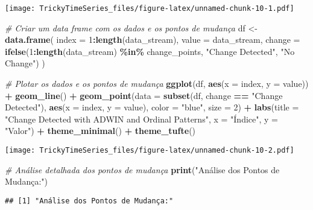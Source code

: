 \documentclass[
]{article}
\newenvironment{Shaded}{\begin{snugshade}}{\end{snugshade}}
\newcommand{\AttributeTok}[1]{\textcolor[rgb]{0.13,0.29,0.53}{#1}}
\newcommand{\CommentTok}[1]{\textcolor[rgb]{0.56,0.35,0.01}{\textit{#1}}}
\newcommand{\DecValTok}[1]{\textcolor[rgb]{0.00,0.00,0.81}{#1}}
\newcommand{\FunctionTok}[1]{\textcolor[rgb]{0.13,0.29,0.53}{\textbf{#1}}}
\newcommand{\NormalTok}[1]{#1}
\newcommand{\OtherTok}[1]{\textcolor[rgb]{0.56,0.35,0.01}{#1}}
\newcommand{\SpecialCharTok}[1]{\textcolor[rgb]{0.81,0.36,0.00}{\textbf{#1}}}
\newcommand{\StringTok}[1]{\textcolor[rgb]{0.31,0.60,0.02}{#1}}
\begin{document}
\texttt{[image: TrickyTimeSeries\_files/figure-latex/unnamed-chunk-10-1.pdf]}

\begin{Shaded}
\begin{Highlighting}[]
\CommentTok{\# Criar um data frame com os dados e os pontos de mudança}
\NormalTok{df }\OtherTok{\textless{}{-}} \FunctionTok{data.frame}\NormalTok{(}
  \AttributeTok{index =} \DecValTok{1}\SpecialCharTok{:}\FunctionTok{length}\NormalTok{(data\_stream),}
  \AttributeTok{value =}\NormalTok{ data\_stream,}
  \AttributeTok{change =} \FunctionTok{ifelse}\NormalTok{(}\DecValTok{1}\SpecialCharTok{:}\FunctionTok{length}\NormalTok{(data\_stream) }\SpecialCharTok{\%in\%}\NormalTok{ change\_points, }\StringTok{"Change Detected"}\NormalTok{, }\StringTok{"No Change"}\NormalTok{)}
\NormalTok{)}

\CommentTok{\# Plotar os dados e os pontos de mudança}
\FunctionTok{ggplot}\NormalTok{(df, }\FunctionTok{aes}\NormalTok{(}\AttributeTok{x =}\NormalTok{ index, }\AttributeTok{y =}\NormalTok{ value)) }\SpecialCharTok{+}
  \FunctionTok{geom\_line}\NormalTok{() }\SpecialCharTok{+}
  \FunctionTok{geom\_point}\NormalTok{(}\AttributeTok{data =} \FunctionTok{subset}\NormalTok{(df, change }\SpecialCharTok{==} \StringTok{"Change Detected"}\NormalTok{), }\FunctionTok{aes}\NormalTok{(}\AttributeTok{x =}\NormalTok{ index, }\AttributeTok{y =}\NormalTok{ value), }\AttributeTok{color =} \StringTok{"blue"}\NormalTok{, }\AttributeTok{size =} \DecValTok{2}\NormalTok{) }\SpecialCharTok{+}
  \FunctionTok{labs}\NormalTok{(}\AttributeTok{title =} \StringTok{"Change Detected with ADWIN and Ordinal Patterns"}\NormalTok{, }\AttributeTok{x =} \StringTok{"Índice"}\NormalTok{, }\AttributeTok{y =} \StringTok{"Valor"}\NormalTok{) }\SpecialCharTok{+}
  \FunctionTok{theme\_minimal}\NormalTok{() }\SpecialCharTok{+}
  \FunctionTok{theme\_tufte}\NormalTok{()}
\end{Highlighting}
\end{Shaded}

\texttt{[image: TrickyTimeSeries\_files/figure-latex/unnamed-chunk-10-2.pdf]}

\begin{Shaded}
\begin{Highlighting}[]
\CommentTok{\# Análise detalhada dos pontos de mudança}
\FunctionTok{print}\NormalTok{(}\StringTok{"Análise dos Pontos de Mudança:"}\NormalTok{)}
\end{Highlighting}
\end{Shaded}

\begin{verbatim}
## [1] "Análise dos Pontos de Mudança:"
\end{verbatim}
\end{document}
